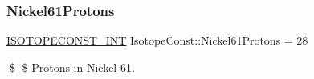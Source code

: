 \subsubsection{\texorpdfstring{Nickel61\+Protons}{Nickel61Protons}}
{\footnotesize\ttfamily \mbox{\hyperlink{group___isotope_const-_macros_ga5f18360b3e99483a35c32d789e62621c}{I\+S\+O\+T\+O\+P\+E\+C\+O\+N\+S\+T\+\_\+\+I\+NT}} Isotope\+Const\+::\+Nickel61\+Protons = 28}

\$ \$ Protons in Nickel-\/61. 